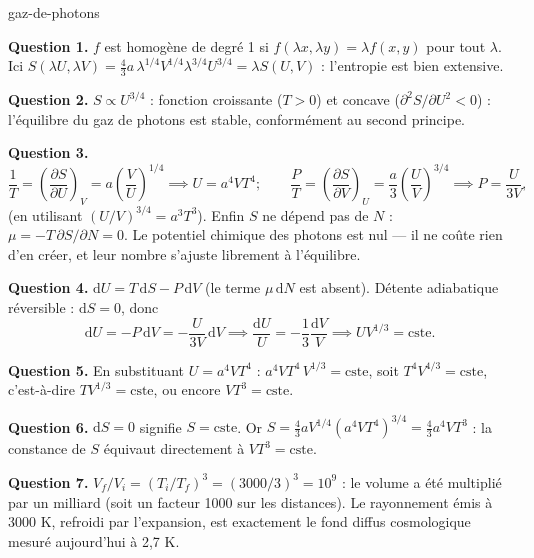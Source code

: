 \begin{exo}{gaz-de-photons}
\begin{solution}
\textbf{Question 1.} $f$ est homogène de degré 1 si $f(\lambda x, \lambda y) = \lambda f(x,y)$ pour tout $\lambda$. Ici $S(\lambda U, \lambda V) = \frac{4}{3}a\,\lambda^{1/4}V^{1/4}\lambda^{3/4}U^{3/4} = \lambda S(U,V)$ : l'entropie est bien extensive.

\textbf{Question 2.} $S \propto U^{3/4}$ : fonction croissante ($T > 0$) et concave ($\partial^2 S/\partial U^2 < 0$) : l'équilibre du gaz de photons est stable, conformément au second principe.

\textbf{Question 3.}
\[
\frac{1}{T} = \left(\frac{\partial S}{\partial U}\right)_V = a\left(\frac{V}{U}\right)^{1/4} \implies U = a^4VT^4 ;
\qquad
\frac{P}{T} = \left(\frac{\partial S}{\partial V}\right)_U = \frac{a}{3}\left(\frac{U}{V}\right)^{3/4} \implies P = \frac{U}{3V},
\]
(en utilisant $(U/V)^{3/4} = a^3T^3$). Enfin $S$ ne dépend pas de $N$ : $\mu = -T\,\partial S/\partial N = 0$. Le potentiel chimique des photons est nul — il ne coûte rien d'en créer, et leur nombre s'ajuste librement à l'équilibre.

\textbf{Question 4.} $\mathrm{d}U = T\,\mathrm{d}S - P\,\mathrm{d}V$ (le terme $\mu\,\mathrm{d}N$ est absent). Détente adiabatique réversible : $\mathrm{d}S = 0$, donc
\[
\mathrm{d}U = -P\,\mathrm{d}V = -\frac{U}{3V}\,\mathrm{d}V \implies \frac{\mathrm{d}U}{U} = -\frac{1}{3}\frac{\mathrm{d}V}{V} \implies UV^{1/3} = \text{cste}.
\]

\textbf{Question 5.} En substituant $U = a^4VT^4$ : $a^4VT^4\,V^{1/3} = \text{cste}$, soit $T^4V^{4/3} = \text{cste}$, c'est-à-dire $TV^{1/3} = \text{cste}$, ou encore $VT^3 = \text{cste}$.

\textbf{Question 6.} $\mathrm{d}S = 0$ signifie $S = \text{cste}$. Or $S = \frac{4}{3}aV^{1/4}(a^4VT^4)^{3/4} = \frac{4}{3}a^4VT^3$ : la constance de $S$ équivaut directement à $VT^3 = \text{cste}$. \checkmark

\textbf{Question 7.} $V_f/V_i = (T_i/T_f)^3 = (3000/3)^3 = 10^9$ : le volume a été multiplié par un milliard (soit un facteur 1000 sur les distances). Le rayonnement émis à 3000 K, refroidi par l'expansion, est exactement le fond diffus cosmologique mesuré aujourd'hui à 2,7 K.
\end{solution}
\end{exo}

